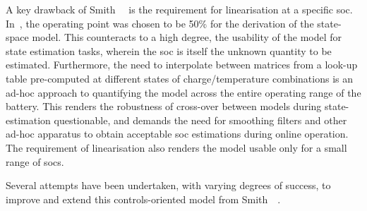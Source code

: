 A key drawback of Smith~\etal{}~\cite{Smith2007} is the requirement for linearisation at a specific \gls{soc}.
In~\cite{Smith2007}, the operating point was chosen to be 50\% for the derivation of the state-space model. This
counteracts to a high degree, the usability of the model for state estimation tasks, wherein the \gls{soc} is itself the
unknown quantity to be estimated. Furthermore, the need to interpolate between matrices from a look-up table
pre-computed at different states of charge/temperature combinations is an ad-hoc approach to quantifying the model
across the entire operating range of the battery. This renders the robustness of cross-over between models during
state-estimation questionable, and demands the need for smoothing filters and other ad-hoc apparatus to obtain
acceptable \gls{soc} estimations during online operation. The requirement of linearisation also renders the model usable
only for a small range of \gls{soc}s.

Several attempts have been undertaken, with varying degrees of success, to improve and extend this controls-oriented
model from Smith~\etal{}~\cite{Smith2007}.









